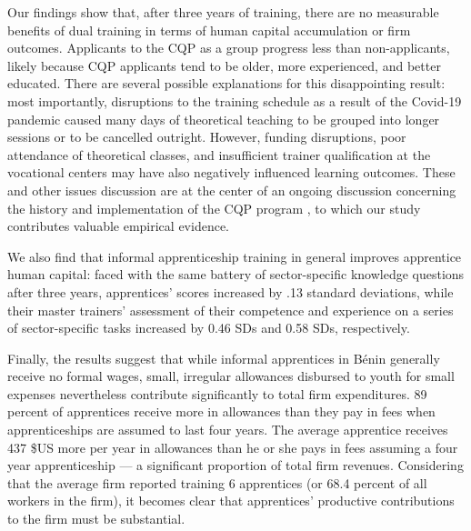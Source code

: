 \documentclass[
  a4paper, twoside, 12pt]{book}
\begin{document}
Our findings show that, after three years of training, there are no measurable benefits of dual training in terms of human capital accumulation or firm outcomes. Applicants to the CQP as a group progress less than non-applicants, likely because CQP applicants tend to be older, more experienced, and better educated. There are several possible explanations for this disappointing result: most importantly, disruptions to the training schedule as a result of the Covid-19 pandemic caused many days of theoretical teaching to be grouped into longer sessions or to be cancelled outright. However, funding disruptions, poor attendance of theoretical classes, and insufficient trainer qualification at the vocational centers may have also negatively influenced learning outcomes. These and other issues discussion are at the center of an ongoing discussion concerning the history and implementation of the CQP program \autocite{davodoun2011,david-gnahoui2017,bankole2020}, to which our study contributes valuable empirical evidence.

We also find that informal apprenticeship training in general improves apprentice human capital: faced with the same battery of sector-specific knowledge questions after three years, apprentices' scores increased by .13 standard deviations, while their master trainers' assessment of their competence and experience on a series of sector-specific tasks increased by 0.46 SDs and 0.58 SDs, respectively.

Finally, the results suggest that while informal apprentices in Bénin generally receive no formal wages, small, irregular allowances disbursed to youth for small expenses nevertheless contribute significantly to total firm expenditures. 89 percent of apprentices receive more in allowances than they pay in fees when apprenticeships are assumed to last four years. The average apprentice receives 437 \$US more per year in allowances than he or she pays in fees assuming a four year apprenticeship --- a significant proportion of total firm revenues. Considering that the average firm reported training 6 apprentices (or 68.4 percent of all workers in the firm), it becomes clear that apprentices' productive contributions to the firm must be substantial.
\end{document}

